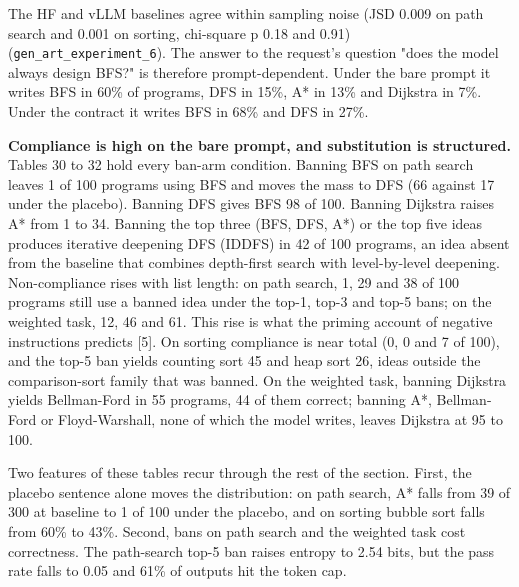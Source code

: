 \documentclass[11pt,letterpaper]{article}
\begin{document}
\endgroup
The HF and vLLM baselines agree within sampling noise (JSD 0.009 on path search and 0.001 on sorting, chi-square p 0.18 and 0.91) (\texttt{gen\_\allowbreak{}art\_\allowbreak{}experiment\_\allowbreak{}6}). The answer to the request's question "does the model always design BFS?" is therefore prompt-dependent. Under the bare prompt it writes BFS in 60\% of programs, DFS in 15\%, A* in 13\% and Dijkstra in 7\%. Under the contract it writes BFS in 68\% and DFS in 27\%.

\textbf{Compliance is high on the bare prompt, and substitution is structured.} Tables 30 to 32 hold every ban-arm condition. Banning BFS on path search leaves 1 of 100 programs using BFS and moves the mass to DFS (66 against 17 under the placebo). Banning DFS gives BFS 98 of 100. Banning Dijkstra raises A* from 1 to 34. Banning the top three (BFS, DFS, A*) or the top five ideas produces iterative deepening DFS (IDDFS) in 42 of 100 programs, an idea absent from the baseline that combines depth-first search with level-by-level deepening. Non-compliance rises with list length: on path search, 1, 29 and 38 of 100 programs still use a banned idea under the top-1, top-3 and top-5 bans; on the weighted task, 12, 46 and 61. This rise is what the priming account of negative instructions predicts [5]. On sorting compliance is near total (0, 0 and 7 of 100), and the top-5 ban yields counting sort 45 and heap sort 26, ideas outside the comparison-sort family that was banned. On the weighted task, banning Dijkstra yields Bellman-Ford in 55 programs, 44 of them correct; banning A*, Bellman-Ford or Floyd-Warshall, none of which the model writes, leaves Dijkstra at 95 to 100.

Two features of these tables recur through the rest of the section. First, the placebo sentence alone moves the distribution: on path search, A* falls from 39 of 300 at baseline to 1 of 100 under the placebo, and on sorting bubble sort falls from 60\% to 43\%. Second, bans on path search and the weighted task cost correctness. The path-search top-5 ban raises entropy to 2.54 bits, but the pass rate falls to 0.05 and 61\% of outputs hit the token cap.
\end{document}

